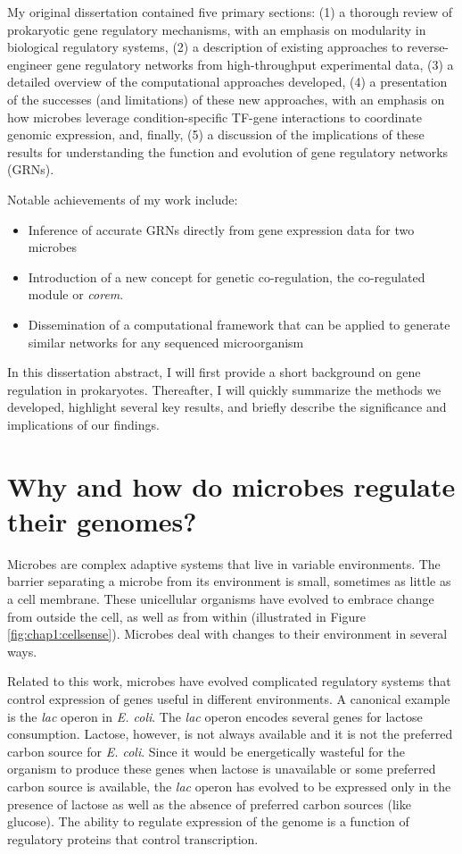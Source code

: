\documentclass{article}
\begin{document}
My original dissertation contained five primary sections: (1) a thorough review of prokaryotic gene regulatory mechanisms, with an emphasis on modularity in biological regulatory systems, (2) a description of existing approaches to reverse-engineer gene regulatory networks from high-throughput experimental data, (3) a detailed overview of the computational approaches developed, (4) a presentation of the successes (and limitations) of these new approaches, with an emphasis on how microbes leverage condition-specific TF-gene interactions to coordinate genomic expression, and, finally, (5) a discussion of the implications of these results for understanding the function and evolution of gene regulatory networks (GRNs).  \vspace{1mm}

Notable achievements of my work include: 
\begin{itemize}
	\item Inference of accurate GRNs directly from gene expression data for two microbes
	\item Introduction of a new concept for genetic co-regulation, the co-regulated module or \textit{corem}.
	\item Dissemination of a computational framework that can be applied to generate similar networks for any sequenced microorganism
\end{itemize}
\vspace{1mm}
In this dissertation abstract, I will first provide a short background on gene regulation in prokaryotes. Thereafter, I will quickly summarize the methods we developed, highlight several key results, and briefly describe the significance and implications of our findings. 

\section{Why and how do microbes regulate their genomes?}

Microbes are complex adaptive systems that live in variable environments. The barrier separating a microbe from its environment is small, sometimes as little as a cell membrane. These unicellular organisms have evolved to embrace change from outside the cell, as well as from within (illustrated in Figure \ref{fig:chap1:cellsense}). Microbes deal with changes to their environment in several ways. 

Related to this work, microbes have evolved complicated regulatory systems that control expression of genes useful in different environments. A canonical example is the \textit{lac} operon in \textit{E. coli}. The \textit{lac} operon encodes several genes for lactose consumption. Lactose, however, is not always available and it is not the preferred carbon source for \textit{E. coli}. Since it would be energetically wasteful for the organism to produce these genes when lactose is unavailable or some preferred carbon source is available, the \textit{lac} operon has evolved to be expressed only in the presence of lactose as well as the absence of preferred carbon sources (like glucose). The ability to regulate expression of the genome is a function of regulatory proteins that control transcription. 
\end{document}

